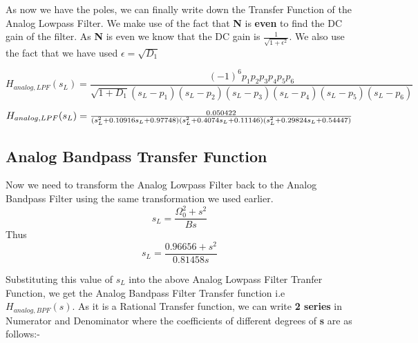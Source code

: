 \documentclass[12pt]{article}
\begin{document}
As now we have the poles, we can finally write down the Transfer Function of the Analog Lowpass Filter. We make use of the fact that \textbf{N} is \textbf{even} to find the DC gain of the filter. As \textbf{N} is even we know that the DC gain is $\frac{1}{\sqrt{1+\epsilon^{2}}}$. We also use the fact that we have used $\epsilon = \sqrt{D_{1}}$

\[H_{analog,LPF}(s_{L}) = \frac{(-1)^{6}p_{1}p_{2}p_{3}p_{4}p_{5}p_{6}}{\sqrt{1+D_{1}}(s_{L} - p_{1})(s_{L} - p_{2})(s_{L} - p_{3})(s_{L} - p_{4})(s_{L} - p_{5})(s_{L} - p_{6})}\]

\[\scalebox{1.1}{$H_{analog,LPF}(s_{L}) = \frac{0.050422}{(s_{L}^2+0.10916s_{L}+0.97748)(s_{L}^2+0.4074s_{L}+0.11146)(s_{L}^2+0.29824s_{L}+0.54447)}$}\]

\subsection{Analog Bandpass Transfer Function}

Now we need to transform the Analog Lowpass Filter back to the Analog Bandpass Filter using the same transformation we used earlier.
\[s_{L} = \frac{\Omega_{0}^2 + s^2}{Bs}\]
Thus
\[s_{L} = \frac{0.96656 + s^2}{0.81458s}\]

Substituting this value of $s_{L}$ into the above Analog Lowpass Filter Tranfer Function, we get the Analog Bandpass Filter Transfer function i.e \textbf{$H_{analog,BPF}(s)$}. As it is a Rational Transfer function, we can write \textbf{2 series} in Numerator and Denominator where the coefficients of different degrees of \textbf{s} are as follows:-
\end{document}
